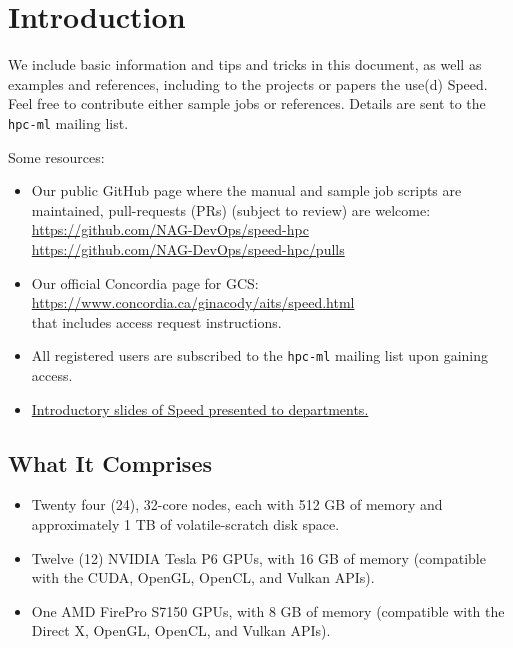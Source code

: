 \documentclass{easychair}
\begin{document}
\section{Introduction}

We include basic information and tips and tricks in this document,
as well as examples and references, including to the projects or
papers the use(d) Speed. Feel free to contribute either sample jobs
or references. Details are sent to the \texttt{hpc-ml} mailing list.

Some resources:

\begin{itemize}
\item
Our public GitHub page where the manual and sample job scripts
are maintained, pull-requests (PRs) (subject to review) are welcome:\\
\url{https://github.com/NAG-DevOps/speed-hpc}\\
\url{https://github.com/NAG-DevOps/speed-hpc/pulls}

\item
Our official Concordia page for GCS:\\
\url{https://www.concordia.ca/ginacody/aits/speed.html}\\
that includes access request instructions.

\item
All registered users are subscribed to the \texttt{hpc-ml} mailing
list upon gaining access.

\item
\href{https://docs.google.com/presentation/d/1bWbGQvYsuJ4U2WsfLYp8S3yb4i7OdU7QDn3l_Q9mYis}{Introductory slides of Speed presented to departments.}

\end{itemize}

\subsection{What It Comprises}

\begin{itemize}
\item
Twenty four (24), 32-core nodes, each with 512 GB of memory and approximately 1 TB of volatile-scratch disk space. 
\item
Twelve (12) NVIDIA Tesla P6 GPUs, with 16 GB of memory (compatible with the CUDA, OpenGL, OpenCL, and Vulkan APIs). 
\item
One AMD FirePro S7150 GPUs, with 8 GB of memory (compatible with the Direct X, OpenGL, OpenCL, and Vulkan APIs). 
\end{itemize}
\end{document}
